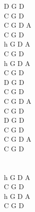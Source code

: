 \documentclass[a5paper, 10pt]{book}
\begin{document}
\begin{minipage}[t]{0.19\textwidth}
  D  G D\\
  C  G D\\
  C G D A\\
  C  G D\\

  h G D A\\
  C G D \\
  h G D A\\
  C G D \\

  D G D \\
  C G D \\
  C G D A\\
  C G D \\

  D G D \\
  C G D \\
  C G D A\\
  C G D \\

  ~\\~\\
  h G D A\\
  C G D \\
  h G D A\\
  C G D \\
\end{minipage}

\newpage
\end{document}

